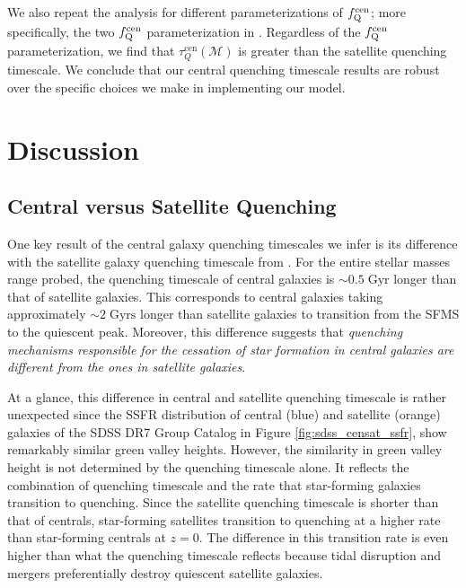 We also repeat the analysis for different parameterizations of 
$f_\mathrm{Q}^\mathrm{cen}$; more specifically, the two $f_\mathrm{Q}^\mathrm{cen}$ parameterization 
in \cite{Wetzel:2013aa}. Regardless of the $f_\mathrm{Q}^\mathrm{cen}$ 
parameterization, we find that $\tau^\mathrm{cen}_Q(\mathcal{M})$ is 
greater than the satellite quenching timescale. We conclude that 
our central quenching timescale results are robust over the specific 
choices we make in implementing our model.

\section{Discussion} \label{sec:discussion}
\subsection{Central versus Satellite Quenching}
One key result of the central galaxy quenching timescales we infer 
is its difference with the satellite galaxy quenching timescale from 
\cite{Wetzel:2013aa}. For the entire stellar masses range probed, 
the quenching timescale of central galaxies is $\sim 0.5\;\mathrm{Gyr}$ 
longer than that of satellite galaxies. This corresponds to central 
galaxies taking approximately $\sim 2 \;\mathrm{Gyrs}$ longer
than satellite galaxies to transition from the SFMS to the quiescent 
peak. Moreover, this difference suggests that {\em quenching 
mechanisms responsible for the cessation of star formation in central 
galaxies are different from the ones in satellite galaxies}. 

At a glance, this difference in central and satellite quenching 
timescale is rather unexpected since the SSFR distribution of
central (blue) and satellite (orange) galaxies of the SDSS DR7 
Group Catalog in Figure \ref{fig:sdss_censat_ssfr}, show remarkably 
similar green valley heights.  
However, the similarity in green valley height is not determined 
by the quenching timescale alone. It reflects the combination 
of quenching timescale and the rate that star-forming galaxies 
transition to quenching. Since the satellite quenching timescale
is shorter than that of centrals, star-forming satellites 
transition to quenching at a higher rate than star-forming 
centrals at $z = 0$. The difference in this transition rate is
even higher than what the quenching timescale reflects because 
tidal disruption and mergers preferentially destroy quiescent 
satellite galaxies.  

